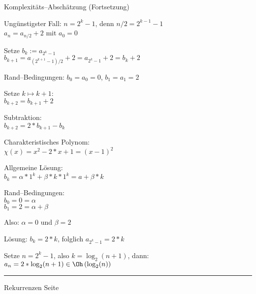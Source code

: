 
\begin{slide}{}
\normalsize

\begin{center}
Komplexit\"ats--Absch\"atzung (Fortsetzung)
\end{center}
\vspace*{0.5cm}

\footnotesize
Ung\"unstigster Fall: $n = 2^k - 1$, denn $n/2 = 2^{k-1} - 1$ \\[0.3cm]
\hspace*{1.3cm} $a_n = a_{n/2} + 2$ mit $a_0 = 0$

Setze $b_k := a_{2^k - 1}$ \\[0.3cm]
\hspace*{1.3cm} $b_{k+1} = a_{(2^{k+1} - 1)/2} + 2 = a_{2^k - 1} + 2 = b_k + 2$

Rand--Bedingungen: $b_0 = a_0 = 0$, $b_1 = a_1 = 2$

Setze $k \mapsto k + 1$: \\[0.3cm]
\hspace*{1.3cm} $b_{k+2} = b_{k+1} + 2$

Subtraktion: \\[0.3cm]
\hspace*{1.3cm} $b_{k+2} = 2 * b_{k+1} - b_k$

Charakteristisches Polynom: \\[0.3cm]
\hspace*{1.3cm} $\chi(x) = x^2 - 2 * x + 1 = (x-1)^2$

Allgemeine L\"osung: \\[0.3cm]
\hspace*{1.3cm} $b_k = \alpha * 1^k + \beta * k * 1^k = a + \beta * k$

Rand--Bedingungen: \\[0.3cm]
\hspace*{1.3cm} $b_0 = 0 = \alpha$ \\[0.3cm]
\hspace*{1.3cm} $b_1 = 2 = \alpha + \beta$

Also: $\alpha = 0$ und $\beta = 2$

L\"osung: $b_k = 2 * k$, folglich $a_{2^k-1} = 2*k$

Setze $n = 2^k-1$, also $k = \log_2(n+1)$, dann: \\[0.3cm]
\hspace*{1.3cm} $a_n = 2*\log_2(n + 1)  \in \Oh\left(\log_2(n)\right)$

\vspace*{\fill}
\tiny \addtocounter{mypage}{1}
\rule{17cm}{1mm}
Rekurrenzen  \hspace*{\fill} Seite 
\end{slide}




